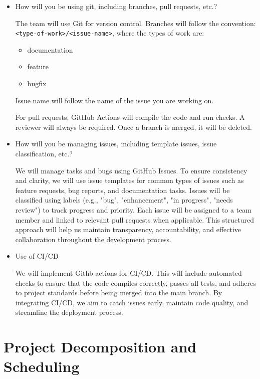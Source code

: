 \documentclass{article}
\begin{document}
\begin{itemize}
  \item How will you be using git, including branches, pull requests, etc.?

  The team will use Git for version control. Branches will follow the convention:
  \texttt{<type-of-work>/<issue-name>}, where the types of work are:
  \begin{itemize}
      \item documentation
      \item feature
      \item bugfix
  \end{itemize}

  Issue name will follow the name of the issue you are working on.

  For pull requests, GitHub Actions will compile the code and run checks. A reviewer will always be required. Once a branch is merged, it will be deleted.

  \item How will you be managing issues, including template issues, issue classification, etc.?
  
  We will manage tasks and bugs using GitHub Issues. To ensure consistency and clarity, we will use issue templates for common types of issues such as feature requests, bug reports, and documentation tasks. Issues will be classified using labels (e.g., "bug", "enhancement", "in progress", "needs review") to track progress and priority. Each issue will be assigned to a team member and linked to relevant pull requests when applicable. This structured approach will help us maintain transparency, accountability, and effective collaboration throughout the development process.

  \item Use of CI/CD
  
  We will implement Githb actions for CI/CD. This will include automated checks to ensure that the code compiles correctly, passes all tests, and adheres to project standards before being merged into the main branch. By integrating CI/CD, we aim to catch issues early, maintain code quality, and streamline the deployment process.  



\end{itemize}


\section{Project Decomposition and Scheduling}
\end{document}
